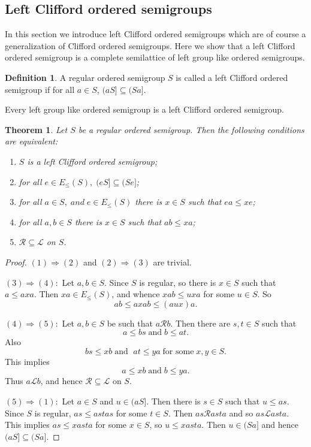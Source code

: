 \documentclass[13pt]{article}
\newtheorem{Theorem}[theorem]{Theorem}
\theoremstyle{definition}
\newtheorem{Definition}[theorem]{Definition}
\theoremstyle{remark}
\numberwithin{equation}{section}
\newcommand{\lc}{\mathcal{L}}
\newcommand{\rc}{\mathcal{R}}
\begin{document}
\subsection{Left Clifford ordered semigroups} In this section we
introduce left Clifford ordered semigroups which are of course a
generalization of Clifford ordered semigroups. Here we show that a
left Clifford ordered semigroup is  a complete semilattice of left
group like ordered semigroups.
\begin{Definition}
A regular ordered  semigroup $S$ is called a left Clifford
 ordered semigroup if for
all $a \in S$,  $(aS] \subseteq (Sa]$.
\end{Definition}
Every left group like ordered semigroup is a left Clifford ordered
semigroup.
\begin{Theorem}\label{cr30}
Let $S$ be a regular ordered  semigroup. Then the following
conditions are equivalent:
\begin{enumerate}
\item \vspace{-.4cm}
$S$ is a left Clifford ordered semigroup;
\item \vspace{-.4cm}
for all $e \in E_{\leq}(S), \;(eS] \subseteq (Se]$;
\item \vspace{-.4cm}
for all $a \in S, \;and \;e \in E_{\leq}(S)$ there is $x\in S$ such
that $ea \leq xe$;
\item \vspace{-.4cm}
for all $a, b \in S$ there is $x\in S$ such that $ab \leq xa$;
\item \vspace{-.4cm}
$\rc \subseteq \lc$ on $S$.
\end{enumerate}
\end{Theorem}
\begin{proof}
$(1)\Rightarrow (2)$ and $(2)\Rightarrow (3)$ are trivial.

$(3)\Rightarrow (4):$ Let $a, b \in S$. Since $S$ is regular, so
there is $x \in S$ such that $a \leq axa$. Then  $xa \in
E_{\leq}(S)$, and whence $xab \leq uxa$ for some $u \in S$. So $$ab
\leq axab \leq (aux)a.$$

$(4)\Rightarrow (5):$ Let $a, b \in S$ be such that $a \rc b$. Then
 there are $s, t \in S$ such that $$a \leq bs \;\textrm{and} \;b \leq at.$$
 Also $$bs \leq xb \;\textrm{and }\;at \leq ya  \;\textrm{for some} \;x, y \in S.$$
This implies  $$a \leq xb \;\textrm{and} \;b \leq ya.$$ Thus $a \lc
b$, and hence $\rc \subseteq \lc$ on $S$.

$(5)\Rightarrow (1):$ Let $a \in S$ and $u \in (aS]$. Then there is
$s \in S$ such that $u \leq as$. Since $S$ is regular,  $as \leq as
t as$ for some $t \in S$. Then $as \rc asta$ and so $as \lc asta$.
This implies $as \leq xasta $ for some $x\in S$, so $u \leq xasta$.
Then $u \in (Sa]$ and hence $(aS] \subseteq  (Sa]$.
\end{proof}
\end{document}
